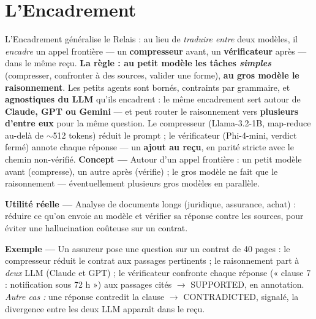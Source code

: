 \documentclass[11pt]{article}
\newcommand{\concept}[1]{{\color{efenavy}\textbf{Concept —} }#1\par}
\newcommand{\exemple}[1]{{\color{efeamber}\textbf{Exemple —} }#1\par}
\newcommand{\utilite}[1]{{\color{efeplum}\textbf{Utilité réelle —} }#1\par}
\begin{document}
\section{L'Encadrement}
L'Encadrement généralise le Relais : au lieu de \emph{traduire entre} deux modèles, il
\emph{encadre} un appel frontière — un \textbf{compresseur} avant, un \textbf{vérificateur} après —
dans le même reçu. \textbf{La règle : au petit modèle les tâches \emph{simples}} (compresser,
confronter à des sources, valider une forme), \textbf{au gros modèle le raisonnement}. Les petits
agents sont bornés, contraints par grammaire, et \textbf{agnostiques du LLM} qu'ils encadrent : le
même encadrement sert autour de \textbf{Claude, GPT ou Gemini} — et peut router le raisonnement
vers \textbf{plusieurs d'entre eux} pour la même question. Le compresseur (Llama-3.2-1B, map-reduce
au-delà de $\sim$512 tokens) réduit le prompt ; le vérificateur (Phi-4-mini, verdict fermé) annote
chaque réponse — un \textbf{ajout au reçu}, en parité stricte avec le chemin non-vérifié.
\concept{Autour d'un appel frontière : un petit modèle avant (compresse), un autre après (vérifie) ;
le gros modèle ne fait que le raisonnement — éventuellement plusieurs gros modèles en parallèle.}
\utilite{Analyse de documents longs (juridique, assurance, achat) : réduire ce qu'on envoie au
modèle et vérifier sa réponse contre les sources, pour éviter une hallucination coûteuse sur un
contrat.}
\exemple{Un assureur pose une question sur un contrat de 40 pages : le compresseur réduit le contrat
aux passages pertinents ; le raisonnement part à \emph{deux} LLM (Claude et GPT) ; le vérificateur
confronte chaque réponse (« clause 7 : notification sous 72 h ») aux passages cités $\rightarrow$
SUPPORTED, en annotation. \emph{Autre cas :} une réponse contredit la clause $\rightarrow$
CONTRADICTED, signalé, la divergence entre les deux LLM apparaît dans le reçu.}
\end{document}
